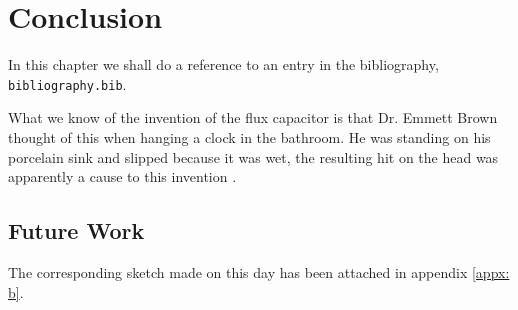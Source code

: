 \section{Conclusion}
\label{sec:section5}

\noindent In this chapter we shall do a reference to an entry in the bibliography, \texttt{bibliography.bib}. 

What we know of the invention of the flux capacitor is that Dr. Emmett Brown thought of this when hanging a clock in the bathroom. He was standing on his porcelain sink and slipped because it was wet, the resulting hit on the head was apparently a cause to this invention \cite{olmeda2021towards}. 

\subsection{Future Work}
The corresponding sketch made on this day has been attached in appendix \ref{appx: b}.

